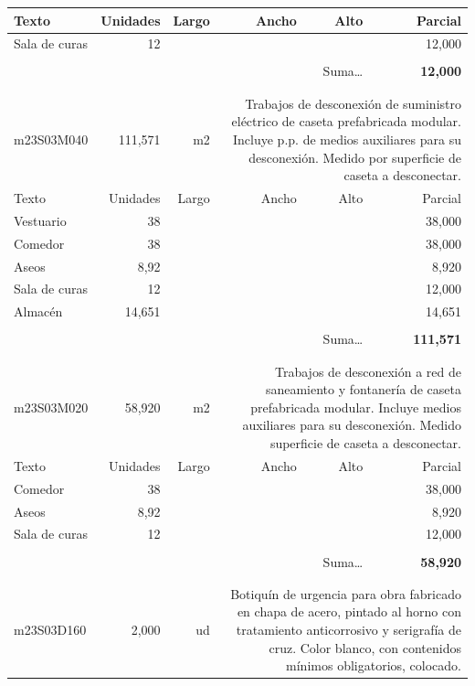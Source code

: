 \documentclass{book}%
\begin{document}
\begin{longtable}{lrrrrr}
Texto&Unidades&Largo&Ancho&Alto&Parcial\\%
\hline%
\multicolumn{1}{p{3.5cm}}{Sala de curas}&12&&&&    12,000\\%
&&&&&\\%
\multicolumn{5}{r}{Suma\ldots}&\textbf{    12,000}\\%
\hline%
&&&&&\\%
&&&&&\\%
m23S03M040&   111,571& m2&\multicolumn{3}{p{6cm}}{\scriptsize Trabajos de desconexión de suministro eléctrico de caseta prefabricada modular. Incluye p.p. de medios auxiliares para su desconexión. Medido por superficie de caseta a desconectar.\normalsize}\\%
Texto&Unidades&Largo&Ancho&Alto&Parcial\\%
\hline%
\multicolumn{1}{p{3.5cm}}{Vestuario}&38&&&&    38,000\\%
\multicolumn{1}{p{3.5cm}}{Comedor}&38&&&&    38,000\\%
\multicolumn{1}{p{3.5cm}}{Aseos}&8,92&&&&     8,920\\%
\multicolumn{1}{p{3.5cm}}{Sala de curas}&12&&&&    12,000\\%
\multicolumn{1}{p{3.5cm}}{Almacén}&14,651&&&&    14,651\\%
&&&&&\\%
\multicolumn{5}{r}{Suma\ldots}&\textbf{   111,571}\\%
\hline%
&&&&&\\%
&&&&&\\%
m23S03M020&    58,920& m2&\multicolumn{3}{p{6cm}}{\scriptsize Trabajos de desconexión a red de saneamiento y fontanería de caseta prefabricada modular. Incluye medios auxiliares para su desconexión. Medido superficie de caseta a desconectar.\normalsize}\\%
Texto&Unidades&Largo&Ancho&Alto&Parcial\\%
\hline%
\multicolumn{1}{p{3.5cm}}{Comedor}&38&&&&    38,000\\%
\multicolumn{1}{p{3.5cm}}{Aseos}&8,92&&&&     8,920\\%
\multicolumn{1}{p{3.5cm}}{Sala de curas}&12&&&&    12,000\\%
&&&&&\\%
\multicolumn{5}{r}{Suma\ldots}&\textbf{    58,920}\\%
\hline%
&&&&&\\%
&&&&&\\%
m23S03D160&     2,000& ud&\multicolumn{3}{p{6cm}}{\scriptsize Botiquín de urgencia para obra fabricado en chapa de acero, pintado al horno con tratamiento anticorrosivo y serigrafía de cruz. Color blanco, con contenidos mínimos obligatorios, colocado.\normalsize}\\%

\end{longtable}
\end{document}

